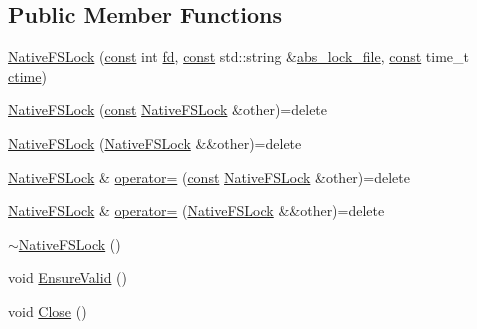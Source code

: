 \subsection*{Public Member Functions}
\begin{DoxyCompactItemize}
\item 
\mbox{\hyperlink{classlucene_1_1core_1_1store_1_1NativeFSLockFactory_1_1NativeFSLock_ab646618f49fd04dd5404a74bdaefd3c4}{Native\+F\+S\+Lock}} (\mbox{\hyperlink{ZlibCrc32_8h_a2c212835823e3c54a8ab6d95c652660e}{const}} int \mbox{\hyperlink{classlucene_1_1core_1_1store_1_1NativeFSLockFactory_1_1NativeFSLock_aecbf3afe520573e5991bc7e08fed3c37}{fd}}, \mbox{\hyperlink{ZlibCrc32_8h_a2c212835823e3c54a8ab6d95c652660e}{const}} std\+::string \&\mbox{\hyperlink{classlucene_1_1core_1_1store_1_1NativeFSLockFactory_1_1NativeFSLock_acd2428c75098a1be466dfd9bec72ccf6}{abs\+\_\+lock\+\_\+file}}, \mbox{\hyperlink{ZlibCrc32_8h_a2c212835823e3c54a8ab6d95c652660e}{const}} time\+\_\+t \mbox{\hyperlink{classlucene_1_1core_1_1store_1_1NativeFSLockFactory_1_1NativeFSLock_abfb301b0a7e90b605382021622251b40}{ctime}})
\item 
\mbox{\hyperlink{classlucene_1_1core_1_1store_1_1NativeFSLockFactory_1_1NativeFSLock_a4ae3db592607c8999ba954d616a2b272}{Native\+F\+S\+Lock}} (\mbox{\hyperlink{ZlibCrc32_8h_a2c212835823e3c54a8ab6d95c652660e}{const}} \mbox{\hyperlink{classlucene_1_1core_1_1store_1_1NativeFSLockFactory_1_1NativeFSLock}{Native\+F\+S\+Lock}} \&other)=delete
\item 
\mbox{\hyperlink{classlucene_1_1core_1_1store_1_1NativeFSLockFactory_1_1NativeFSLock_ac11af487980a21b6d36b0f5ff2ecfd0d}{Native\+F\+S\+Lock}} (\mbox{\hyperlink{classlucene_1_1core_1_1store_1_1NativeFSLockFactory_1_1NativeFSLock}{Native\+F\+S\+Lock}} \&\&other)=delete
\item 
\mbox{\hyperlink{classlucene_1_1core_1_1store_1_1NativeFSLockFactory_1_1NativeFSLock}{Native\+F\+S\+Lock}} \& \mbox{\hyperlink{classlucene_1_1core_1_1store_1_1NativeFSLockFactory_1_1NativeFSLock_a0cb2104935817be41d6d106d9ed75f81}{operator=}} (\mbox{\hyperlink{ZlibCrc32_8h_a2c212835823e3c54a8ab6d95c652660e}{const}} \mbox{\hyperlink{classlucene_1_1core_1_1store_1_1NativeFSLockFactory_1_1NativeFSLock}{Native\+F\+S\+Lock}} \&other)=delete
\item 
\mbox{\hyperlink{classlucene_1_1core_1_1store_1_1NativeFSLockFactory_1_1NativeFSLock}{Native\+F\+S\+Lock}} \& \mbox{\hyperlink{classlucene_1_1core_1_1store_1_1NativeFSLockFactory_1_1NativeFSLock_a9905a3b03418807da7c1001b55c53ae1}{operator=}} (\mbox{\hyperlink{classlucene_1_1core_1_1store_1_1NativeFSLockFactory_1_1NativeFSLock}{Native\+F\+S\+Lock}} \&\&other)=delete
\item 
\mbox{\hyperlink{classlucene_1_1core_1_1store_1_1NativeFSLockFactory_1_1NativeFSLock_abaa3462e57165f234135a77750266737}{$\sim$\+Native\+F\+S\+Lock}} ()
\item 
void \mbox{\hyperlink{classlucene_1_1core_1_1store_1_1NativeFSLockFactory_1_1NativeFSLock_ac07d2b080272048dd7edb5ed0eca0396}{Ensure\+Valid}} ()
\item 
void \mbox{\hyperlink{classlucene_1_1core_1_1store_1_1NativeFSLockFactory_1_1NativeFSLock_abf6743e414d802ed2f715a5c7884c0a9}{Close}} ()
\end{DoxyCompactItemize}
